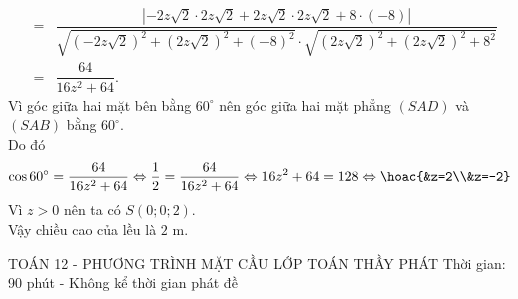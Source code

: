 \begin{ex}
{\begin{eqnarray*}
	&=&\dfrac{|-2z\sqrt{2}\cdot 2z\sqrt{2}+2z\sqrt{2}\cdot 2z\sqrt{2}+8\cdot(-8)|}{\sqrt{(-2z\sqrt{2})^2+(2z\sqrt{2})^2+(-8)^2}\cdot \sqrt{(2z\sqrt{2})^2+(2z\sqrt{2})^2+8^2}}\\
	&=&\dfrac{64}{16z^2+64}.
	\end{eqnarray*}
	Vì góc giữa hai mặt bên bằng $60^{\circ}$ nên góc giữa hai mặt phẳng $(SAD)$ và $(SAB)$ bằng $60^{\circ}$.\\
	Do đó
	$$\cos 60^{\circ}=\dfrac{64}{16z^2+64} \Leftrightarrow \dfrac{1}{2}=\dfrac{64}{16z^2+64}\Leftrightarrow 16z^2+64=128\Leftrightarrow \hoac{&z=2\\&z=-2}$$
	Vì $z>0$ nên ta có $S(0;0;2)$.\\
	Vậy chiều cao của lều là $2$ m.
	}
\end{ex}

\begin{name}
	{\tenchude}
	{TOÁN 12 - PHƯƠNG TRÌNH MẶT CẦU}
	{LỚP TOÁN THẦY PHÁT}
	{Thời gian: 90 phút - Không kể thời gian phát đề}
\end{name}

